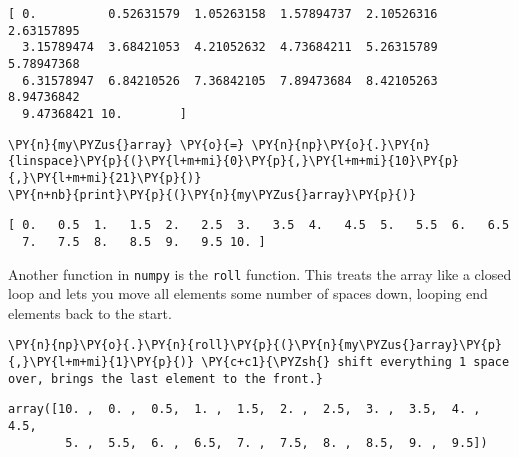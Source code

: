     \begin{Verbatim}[commandchars=\\\{\}]
[ 0.          0.52631579  1.05263158  1.57894737  2.10526316  2.63157895
  3.15789474  3.68421053  4.21052632  4.73684211  5.26315789  5.78947368
  6.31578947  6.84210526  7.36842105  7.89473684  8.42105263  8.94736842
  9.47368421 10.        ]
    \end{Verbatim}

    \begin{tcolorbox}[breakable, size=fbox, boxrule=1pt, pad at break*=1mm,colback=cellbackground, colframe=cellborder]
\begin{Verbatim}[commandchars=\\\{\}]
\PY{n}{my\PYZus{}array} \PY{o}{=} \PY{n}{np}\PY{o}{.}\PY{n}{linspace}\PY{p}{(}\PY{l+m+mi}{0}\PY{p}{,}\PY{l+m+mi}{10}\PY{p}{,}\PY{l+m+mi}{21}\PY{p}{)}
\PY{n+nb}{print}\PY{p}{(}\PY{n}{my\PYZus{}array}\PY{p}{)}
\end{Verbatim}
\end{tcolorbox}

    \begin{Verbatim}[commandchars=\\\{\}]
[ 0.   0.5  1.   1.5  2.   2.5  3.   3.5  4.   4.5  5.   5.5  6.   6.5
  7.   7.5  8.   8.5  9.   9.5 10. ]
    \end{Verbatim}

    Another function in \texttt{numpy} is the \texttt{roll} function. This
treats the array like a closed loop and lets you move all elements some
number of spaces down, looping end elements back to the start.

    \begin{tcolorbox}[breakable, size=fbox, boxrule=1pt, pad at break*=1mm,colback=cellbackground, colframe=cellborder]
\begin{Verbatim}[commandchars=\\\{\}]
\PY{n}{np}\PY{o}{.}\PY{n}{roll}\PY{p}{(}\PY{n}{my\PYZus{}array}\PY{p}{,}\PY{l+m+mi}{1}\PY{p}{)} \PY{c+c1}{\PYZsh{} shift everything 1 space over, brings the last element to the front.}
\end{Verbatim}
\end{tcolorbox}

            \begin{tcolorbox}[breakable, size=fbox, boxrule=.5pt, pad at break*=1mm, opacityfill=0]
\begin{Verbatim}[commandchars=\\\{\}]
array([10. ,  0. ,  0.5,  1. ,  1.5,  2. ,  2.5,  3. ,  3.5,  4. ,  4.5,
        5. ,  5.5,  6. ,  6.5,  7. ,  7.5,  8. ,  8.5,  9. ,  9.5])
\end{Verbatim}
\end{tcolorbox}
        
